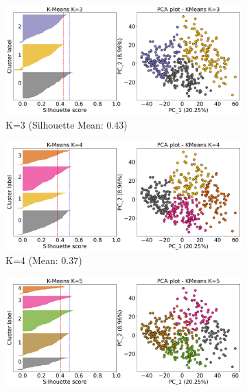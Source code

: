 \begin{figure}[H]
    \captionsetup[subfigure]{justification=Centering}
    \centering
    \begin{subfigure}[!t]{0.49\textwidth}
        \includegraphics[width=\textwidth]{Sections/ClusteringAnalysis/Resources/cs_top3/sill_distrib/KMeans_3_sill_distrib.png}
        \caption{K=3 (Silhouette Mean: $0.43$)}
    \end{subfigure}
    \centering
    \begin{subfigure}[!t]{0.49\textwidth}
        \includegraphics[width=\textwidth]{Sections/ClusteringAnalysis/Resources/cs_top3/sill_distrib/KMeans_4_sill_distrib.png}
        \caption{K=4 (Mean: $0.37$)}
    \end{subfigure}
    \centering
    \begin{subfigure}[!t]{0.49\textwidth}
        \includegraphics[width=\textwidth]{Sections/ClusteringAnalysis/Resources/cs_top3/sill_distrib/KMeans_5_sill_distrib.png}

\end{subfigure}
\end{figure}
